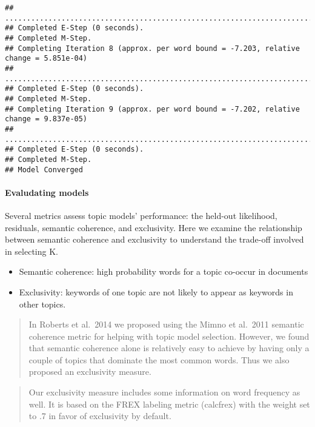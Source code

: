 \documentclass[
]{book}
\begin{document}
\begin{verbatim}
## ....................................................................................................
## Completed E-Step (0 seconds). 
## Completed M-Step. 
## Completing Iteration 8 (approx. per word bound = -7.203, relative change = 5.851e-04) 
## ....................................................................................................
## Completed E-Step (0 seconds). 
## Completed M-Step. 
## Completing Iteration 9 (approx. per word bound = -7.202, relative change = 9.837e-05) 
## ....................................................................................................
## Completed E-Step (0 seconds). 
## Completed M-Step. 
## Model Converged
\end{verbatim}

\hypertarget{evaludating-models}{%
\paragraph{Evaludating models}\label{evaludating-models}}

Several metrics assess topic models' performance: the held-out likelihood, residuals, semantic coherence, and exclusivity. Here we examine the relationship between semantic coherence and exclusivity to understand the trade-off involved in selecting K.

\begin{itemize}
\item
  Semantic coherence: high probability words for a topic co-occur in documents
\item
  Exclusivity: keywords of one topic are not likely to appear as keywords in other topics.
\end{itemize}

\begin{quote}
In Roberts et al.~2014 we proposed using the Mimno et al.~2011 semantic coherence metric for helping with topic model selection. However, we found that semantic coherence alone is relatively easy to achieve by having only a couple of topics that dominate the most common words. Thus we also proposed an exclusivity measure.
\end{quote}

\begin{quote}
Our exclusivity measure includes some information on word frequency as well. It is based on the FREX labeling metric (calcfrex) with the weight set to .7 in favor of exclusivity by default.
\end{quote}
\end{document}
